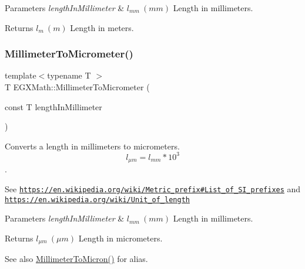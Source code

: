 \begin{DoxyParams}{Parameters}
{\em length\+In\+Millimeter} & $ l_{mm}\ (mm)$ Length in millimeters. \\
\hline
\end{DoxyParams}
\begin{DoxyReturn}{Returns}
$ l_{m}\ (m)$ Length in meters. 
\end{DoxyReturn}
\mbox{\label{group___e_g_x_math-_conversions-_length_conversions-_s_i-_millimeter-_s_i_gadec5d89ecdd6bfe638f54ceffe0e0630}} 
\subsubsection{\texorpdfstring{Millimeter\+To\+Micrometer()}{MillimeterToMicrometer()}}
{\footnotesize\ttfamily template$<$typename T $>$ \\
T E\+G\+X\+Math\+::\+Millimeter\+To\+Micrometer (\begin{DoxyParamCaption}\item[{const T}]{length\+In\+Millimeter }\end{DoxyParamCaption})}



Converts a length in millimeters to micrometers. \[ l_{\mu m}=l_{mm} * 10^{3} \]. 

See \href{https://en.wikipedia.org/wiki/Metric_prefix#List_of_SI_prefixes}{\tt https\+://en.\+wikipedia.\+org/wiki/\+Metric\+\_\+prefix\#\+List\+\_\+of\+\_\+\+S\+I\+\_\+prefixes} and \href{https://en.wikipedia.org/wiki/Unit_of_length}{\tt https\+://en.\+wikipedia.\+org/wiki/\+Unit\+\_\+of\+\_\+length} 
\begin{DoxyParams}{Parameters}
{\em length\+In\+Millimeter} & $ l_{mm}\ (mm)$ Length in millimeters. \\
\hline
\end{DoxyParams}
\begin{DoxyReturn}{Returns}
$ l_{\mu m}\ (\mu m)$ Length in micrometers. 
\end{DoxyReturn}
\begin{DoxySeeAlso}{See also}
\mbox{\hyperlink{group___e_g_x_math-_conversions-_length_conversions-_s_i-_millimeter-_non-_s_i_ga47eac74d2eeec20afc801e61d53f67a0}{Millimeter\+To\+Micron()}} for alias. 
\end{DoxySeeAlso}
\mbox{\label{group___e_g_x_math-_conversions-_length_conversions-_s_i-_millimeter-_s_i_ga4ed79a00a348e87b09e55e34d852841c}} 
